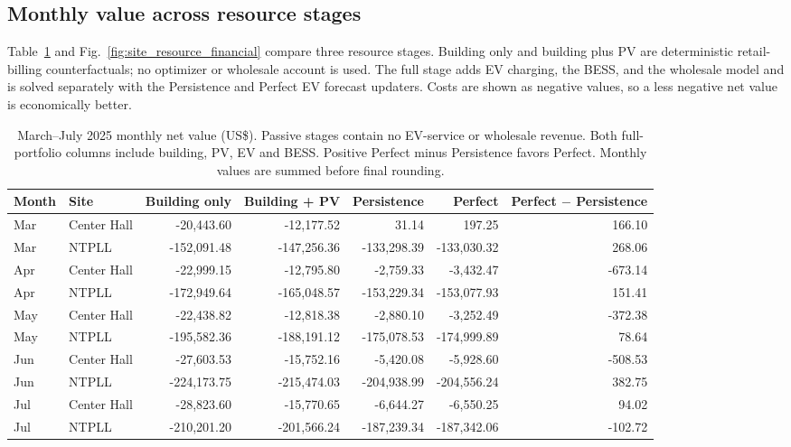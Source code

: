 \documentclass[final,5p,times]{elsarticle}
\begin{document}
\subsection{Monthly value across resource stages}
\label{sec:site_monthly_value}

Table~\ref{tab:site_monthly_results} and
Fig.~\ref{fig:site_resource_financial} compare three resource stages. Building
only and building plus PV are deterministic retail-billing counterfactuals; no
optimizer or wholesale account is used. The full stage adds EV charging, the
BESS, and the wholesale model and is solved separately with the Persistence and
Perfect EV forecast updaters. Costs are shown as negative values, so a less
negative net value is economically better.

\begin{table}[!t]
\centering
\caption{March--July 2025 monthly net value (US\$). Passive stages contain no EV-service or wholesale revenue. Both full-portfolio columns include building, PV, EV and BESS. Positive Perfect minus Persistence favors Perfect. Monthly values are summed before final rounding.}
\label{tab:site_monthly_results}
\scriptsize
\setlength{\tabcolsep}{5pt}
\begin{tabular}{@{}llrrrrr@{}}
\toprule
Month & Site & Building only & Building + PV & Persistence & Perfect & Perfect $-$ Persistence\\
\midrule
Mar & Center Hall & -20,443.60 & -12,177.52 & 31.14 & 197.25 & 166.10 \\
Mar & NTPLL & -152,091.48 & -147,256.36 & -133,298.39 & -133,030.32 & 268.06 \\
Apr & Center Hall & -22,999.15 & -12,795.80 & -2,759.33 & -3,432.47 & -673.14 \\
Apr & NTPLL & -172,949.64 & -165,048.57 & -153,229.34 & -153,077.93 & 151.41 \\
May & Center Hall & -22,438.82 & -12,818.38 & -2,880.10 & -3,252.49 & -372.38 \\
May & NTPLL & -195,582.36 & -188,191.12 & -175,078.53 & -174,999.89 & 78.64 \\
Jun & Center Hall & -27,603.53 & -15,752.16 & -5,420.08 & -5,928.60 & -508.53 \\
Jun & NTPLL & -224,173.75 & -215,474.03 & -204,938.99 & -204,556.24 & 382.75 \\
Jul & Center Hall & -28,823.60 & -15,770.65 & -6,644.27 & -6,550.25 & 94.02 \\
Jul & NTPLL & -210,201.20 & -201,566.24 & -187,239.34 & -187,342.06 & -102.72 \\
\bottomrule
\end{tabular}
\end{table}
\end{document}
